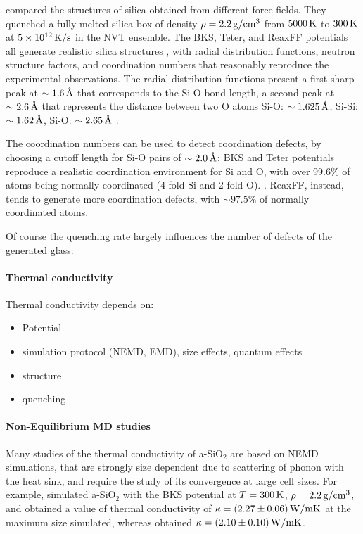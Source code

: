 \citet{Tian2017} compared the structures of silica obtained from different force fields. They quenched a fully melted silica box of density $\rho=2.2\,\mathrm{g/cm^3}$ from $5000\,\mathrm{K}$ to $300\,\mathrm{K}$ at $5\times 10^{12}\,\mathrm{K/s}$ in the NVT ensemble. 
The BKS, Teter, and ReaxFF potentials all generate realistic silica structures \cite{Vollmayr1996,Yu2016,Yuan2001}, with radial distribution functions, neutron structure factors, and coordination numbers that reasonably reproduce the experimental observations.
The radial distribution functions present a first sharp peak at $\sim 1.6\,\mathrm{{\mbox{\AA}}}$ that corresponds to the Si-O bond length, a second peak at $\sim 2.6\,\mathrm{{\mbox{\AA}}}$ that represents the distance between two O atoms
Si-O: $\sim 1.625\,\mathrm{{\mbox{\AA}}}$, Si-Si: $\sim 1.62\,\mathrm{{\mbox{\AA}}}$, Si-O: $\sim 2.65\,\mathrm{{\mbox{\AA}}}$ \cite{Bhattarai2016}.

The coordination numbers can be used to detect coordination defects, by choosing a cutoff length for Si-O pairs of $\sim 2.0\,\mathrm{{\mbox{\AA}}}$: BKS and Teter potentials reproduce a realistic coordination environment for Si and O, with over $99.6\%$ of atoms being normally coordinated (4-fold Si and 2-fold O). . ReaxFF, instead, tends to generate more coordination defects, with $\sim 97.5\%$ of normally coordinated atoms.

Of course the quenching rate largely influences the number of defects of the generated glass. 

\paragraph{Thermal conductivity}
Thermal conductivity depends on:
\begin{itemize}
    \item Potential
    \item simulation protocol (NEMD, EMD), size effects, quantum effects
    \item structure
    \item quenching
\end{itemize}

\paragraph{Non-Equilibrium MD studies}
Many studies of the thermal conductivity of a-SiO$_2$ are based on NEMD simulations, that are strongly size dependent due to scattering of phonon with the heat sink, and require the study of its convergence at large cell sizes. 
For example, \citet{Tian2017} simulated a-SiO$_2$ with the BKS potential at $T=300\,\mathrm{K}$, $\rho=2.2\,\mathrm{g/cm^3}$, and obtained a value of thermal conductivity of $\kappa=(2.27 \pm 0.06)\,\mathrm{W/mK}$ at the maximum size simulated, whereas \citet{Coquil2011} obtained $\kappa= (2.10 \pm 0.10)\,\mathrm{W/mK}$. 

